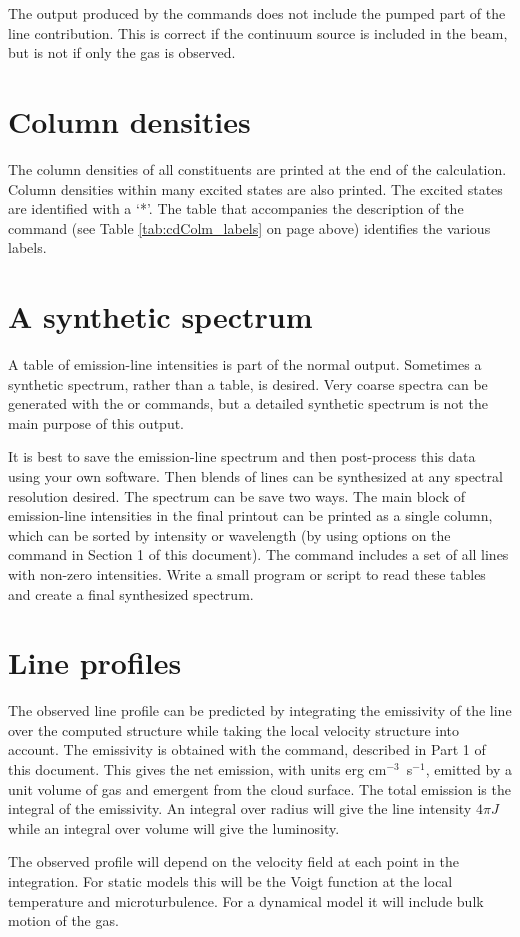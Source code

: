 The output produced by the  commands
does not include
the pumped part of the line contribution.
This is correct if the continuum
source is included in the beam, but is not if only the gas is observed.

\section{Column densities}

The column densities of all constituents are printed at the end of the
calculation.
Column densities within many excited states are also printed.
The excited states are identified with a `*'.
The table that
accompanies the description of the  command
(see Table \ref{tab:cdColm_labels} on page
\pageref{tab:cdColm_labels} above)
identifies the various labels.

\section{A synthetic spectrum}

A table of emission-line intensities is part of the normal output.
Sometimes a synthetic spectrum, rather than a table, is desired.
Very coarse
spectra can be generated with the  or
 commands,
but a detailed synthetic spectrum is not the main purpose of this output.

It is best to save the emission-line spectrum and then post-process this
data using your own software.  Then blends of lines can be synthesized at
any spectral resolution desired.
The spectrum can be save two ways.
The main block of emission-line intensities in the final printout
can be printed as a single column, which can be sorted by intensity
or wavelength (by using
options on the  command in Section 1 of this document).
The
 command includes a set of all lines with non-zero intensities.
Write a small program or script to read these tables and create a final
synthesized spectrum.

\section{Line profiles}

The observed line profile can be predicted by integrating the emissivity
of the line over the computed structure while taking the local velocity
structure into account.
The emissivity is obtained with the
 command,
described in Part 1 of this document.
This gives the
net emission, with units erg cm$^{-3}$~s$^{-1}$,
emitted by a unit volume of gas and
emergent from the cloud surface.
The total emission is the integral of
the emissivity.
An integral over radius will give the line intensity $4\pi J$
while an integral over volume will give the luminosity.

The observed profile will depend on the velocity field at each point
in the integration.
For static models this will be the Voigt function at
the local temperature and microturbulence.
For a dynamical model it will
include bulk motion of the gas.


